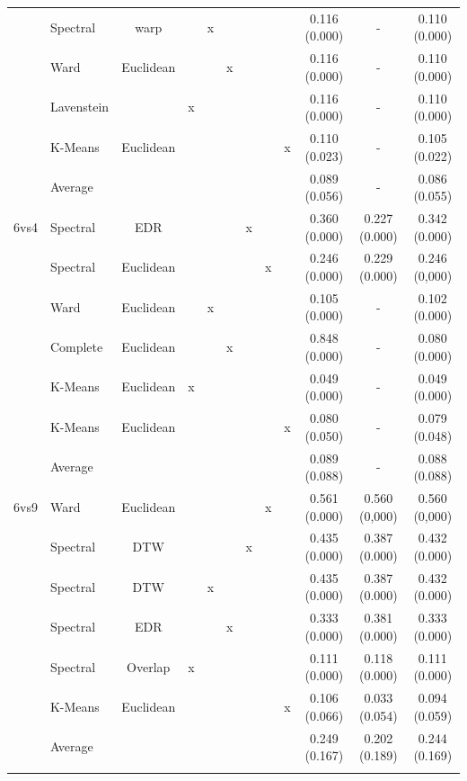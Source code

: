 \documentclass[12pt,a4paper,bibliography=totocnumbered,listof=totocnumbered]{scrartcl}
\begin{document}
{\begin{appendix}
\begin{table}[!htbp]
\begin{tabular}{@{\extracolsep{0pt}} llcccccccccc}
		& Spectral & warp &  & x &  &  &  &  & 0.116 (0.000) & - & 0.110 (0.000) \\ 
		& Ward & Euclidean &  &  & x &  &  &  & 0.116 (0.000) & - & 0.110 (0.000) \\ 
		& Lavenstein &  & x &  &  &  &  &  & 0.116 (0.000) & - & 0.110 (0.000) \\ 
		& K-Means & Euclidean &  &  &  &  &  & x & 0.110 (0.023) & - & 0.105 (0.022) \\ 
		& Average &  &  &  &  &  &  &  & 0.089 (0.056) & - & 0.086 (0.055) \\ 
		6vs4 & Spectral & EDR &  &  &  & x &  &  & 0.360 (0.000) & 0.227 (0.000) & 0.342 (0.000) \\ 
		& Spectral & Euclidean  &  &  &  &  & x &  & 0.246 (0.000) & 0.229 (0.000) & 0.246 (0,000) \\ 
		& Ward & Euclidean  &  & x &  &  &  &  & 0.105 (0.000) & - & 0.102 (0.000) \\ 
		& Complete & Euclidean  &  &  & x &  &  &  & 0.848 (0.000) & - & 0.080 (0.000) \\ 
		& K-Means & Euclidean  & x &  &  &  &  &  & 0.049 (0.000) & - & 0.049 (0.000) \\ 
		& K-Means & Euclidean  &  &  &  &  &  & x & 0.080 (0.050) & - & 0.079 (0.048) \\ 
		& Average &  &  &  &  &  &  &  & 0.089 (0.088) & - & 0.088 (0.088) \\ 
		6vs9 & Ward  & Euclidean &  &  &  &  & x &  & 0.561 (0.000) & 0.560 (0,000) & 0.560 (0,000) \\ 
		& Spectral & DTW &  &  &  & x &  &  & 0.435 (0.000) & 0.387 (0.000) & 0.432 (0.000) \\ 
		& Spectral & DTW &  & x &  &  &  &  & 0.435 (0.000) & 0.387 (0.000) & 0.432 (0.000) \\ 
		& Spectral & EDR &  &  & x &  &  &  & 0.333 (0.000) & 0.381 (0.000) & 0.333 (0.000) \\ 
		& Spectral & Overlap & x &  &  &  &  &  & 0.111 (0.000) & 0.118 (0.000) & 0.111 (0.000) \\ 
		& K-Means & Euclidean &  &  &  &  &  & x & 0.106 (0.066) & 0.033 (0.054) & 0.094 (0.059) \\ 
		& Average &  &  &  &  &  &  &  & 0.249 (0.167) & 0.202 (0.189) & 0.244 (0.169) \\ 
		\hline \\[-1.8ex] 
	\end{tabular} 
	\label{tab:prison1}
\end{table} 


\end{appendix}}
\end{document}
